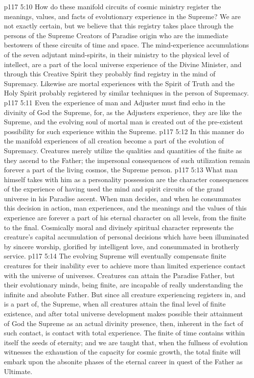 \vs p117 5:10 How do these manifold circuits of cosmic ministry register the meanings, values, and facts of evolutionary experience in the Supreme? We are not exactly certain, but we believe that this registry takes place through the persons of the Supreme Creators of Paradise origin who are the immediate bestowers of these circuits of time and space. The mind\hyp{}experience accumulations of the seven adjutant mind\hyp{}spirits, in their ministry to the physical level of intellect, are a part of the local universe experience of the Divine Minister, and through this Creative Spirit they probably find registry in the mind of Supremacy. Likewise are mortal experiences with the Spirit of Truth and the Holy Spirit probably registered by similar techniques in the person of Supremacy.
\vs p117 5:11 Even the experience of man and Adjuster must find echo in the divinity of God the Supreme, for, as the Adjusters experience, they are like the Supreme, and the evolving soul of mortal man is created out of the pre\hyp{}existent possibility for such experience within the Supreme.
\vs p117 5:12 In this manner do the manifold experiences of all creation become a part of the evolution of Supremacy. Creatures merely utilize the qualities and quantities of the finite as they ascend to the Father; the impersonal consequences of such utilization remain forever a part of the living cosmos, the Supreme person.
\vs p117 5:13 What man himself takes with him as a personality possession are the character consequences of the experience of having used the mind and spirit circuits of the grand universe in his Paradise ascent. When man decides, and when he consummates this decision in action, man experiences, and the meanings and the values of this experience are forever a part of his eternal character on all levels, from the finite to the final. Cosmically moral and divinely spiritual character represents the creature’s capital accumulation of personal decisions which have been illuminated by sincere worship, glorified by intelligent love, and consummated in brotherly service.
\vs p117 5:14 The evolving Supreme will eventually compensate finite creatures for their inability ever to achieve more than limited experience contact with the universe of universes. Creatures can attain the Paradise Father, but their evolutionary minds, being finite, are incapable of really understanding the infinite and absolute Father. But since all creature experiencing registers in, and is a part of, the Supreme, when all creatures attain the final level of finite existence, and after total universe development makes possible their attainment of God the Supreme as an actual divinity presence, then, inherent in the fact of such contact, is contact with total experience. The finite of time contains within itself the seeds of eternity; and we are taught that, when the fullness of evolution witnesses the exhaustion of the capacity for cosmic growth, the total finite will embark upon the absonite phases of the eternal career in quest of the Father as Ultimate.
